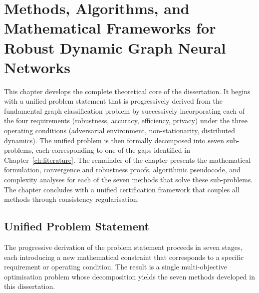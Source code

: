 
\chapter{Methods, Algorithms, and Mathematical Frameworks for Robust Dynamic Graph Neural Networks}
\label{ch:methods}

This chapter develops the complete theoretical core of the dissertation. It begins with a unified problem statement that is progressively derived from the fundamental graph classification problem by successively incorporating each of the four requirements (robustness, accuracy, efficiency, privacy) under the three operating conditions (adversarial environment, non-stationarity, distributed dynamics). The unified problem is then formally decomposed into seven sub-problems, each corresponding to one of the gaps identified in Chapter~\ref{ch:literature}. The remainder of the chapter presents the mathematical formulation, convergence and robustness proofs, algorithmic pseudocode, and complexity analyses for each of the seven methods that solve these sub-problems. The chapter concludes with a unified certification framework that couples all methods through consistency regularisation.


\section{Unified Problem Statement}
\label{sec:problem_statement}
\label{sec:unified_problem}

The progressive derivation of the problem statement proceeds in seven stages, each introducing a new mathematical constraint that corresponds to a specific requirement or operating condition. The result is a single multi-objective optimisation problem whose decomposition yields the seven methods developed in this dissertation.


